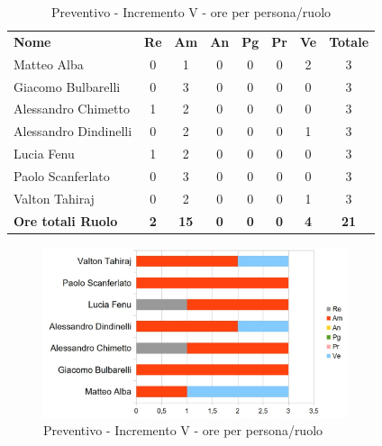 \begin{table} [h!]
	\begin{center}
		\begin{tabular} { m{3.5cm} c c c c c c c }
			\rowcolor{lightgray}
			\textbf{Nome} & \textbf{Re} & \textbf{Am} & \textbf{An} & \textbf{Pg} & \textbf{Pr} & \textbf{Ve} & \textbf{Totale} \\
			Matteo Alba & 0 & 1 & 0 & 0 & 0 & 2 & 3 \\
			Giacomo Bulbarelli & 0 & 3 & 0 & 0 & 0 & 0 & 3 \\
			Alessandro Chimetto & 1 & 2 & 0 & 0 & 0 & 0 & 3 \\
			Alessandro Dindinelli & 0 & 2 & 0 & 0 & 0 & 1 & 3 \\
			Lucia Fenu & 1 & 2 & 0 & 0 & 0 & 0 & 3 \\
			Paolo Scanferlato & 0 & 3 & 0 & 0 & 0 & 0 & 3 \\
			Valton Tahiraj & 0 & 2 & 0 & 0 & 0 & 1 & 3 \\
			\textbf{Ore totali Ruolo} & \textbf{2} & \textbf{15} & \textbf{0} & \textbf{0} & \textbf{0}& \textbf{4} & \textbf{21}
		\end{tabular}
		\caption{Preventivo - Incremento V - ore per persona/ruolo}
	\end{center}
\end{table}
\begin{figure} [h!]
	\centering
	\includegraphics[width=0.8\textwidth]{res/img/grafici/Incremento5Ore.jpg}
	\caption{Preventivo - Incremento V - ore per persona/ruolo} 
\end{figure}

\newpage
